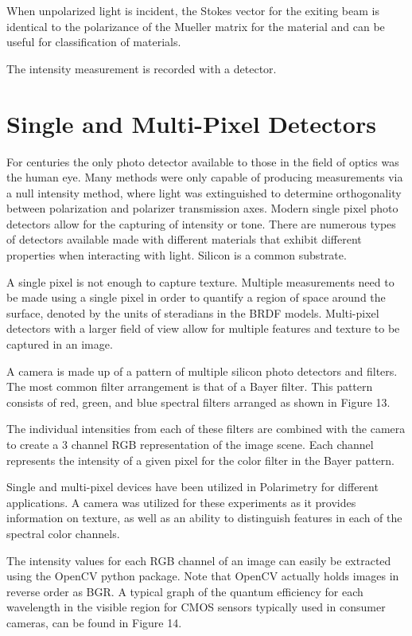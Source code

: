 When unpolarized light is incident, the Stokes vector for the exiting beam is identical to the polarizance of the Mueller matrix for the material and can be useful for classification of materials.

The intensity measurement is recorded with a detector.

\section{Single and Multi-Pixel Detectors}
For centuries the only photo detector available to those in the field of optics was the human eye.  Many methods were only capable of producing measurements via a null intensity method, where light was extinguished to determine orthogonality between polarization and polarizer transmission axes.  Modern single pixel photo detectors allow for the capturing of intensity or tone.  There are numerous types of detectors available made with different materials that exhibit different properties when interacting with light.  Silicon is a common substrate.

A single pixel is not enough to capture texture.  Multiple measurements need to be made using a single pixel in order to quantify a region of space around the surface, denoted by the units of steradians in the BRDF models.  Multi-pixel detectors with a larger field of view allow for multiple features and texture to be captured in an image.

A camera is made up of a pattern of multiple silicon photo detectors and filters.  The most common filter arrangement is that of a Bayer filter.  This pattern consists of red, green, and blue spectral filters arranged as shown in Figure 13.

The individual intensities from each of these filters are combined with the camera to create a 3 channel RGB representation of the image scene.  Each channel represents the intensity of a given pixel for the color filter in the Bayer pattern.

Single and multi-pixel devices have been utilized in Polarimetry for different applications.  A camera was utilized for these experiments as it provides information on texture, as well as an ability to distinguish features in each of the spectral color channels.

The intensity values for each RGB channel of an image can easily be extracted using the OpenCV python package.  Note that OpenCV actually holds images in reverse order as BGR.  A typical graph of the quantum efficiency for each wavelength in the visible region for CMOS sensors typically used in consumer cameras, can be found in Figure 14.

